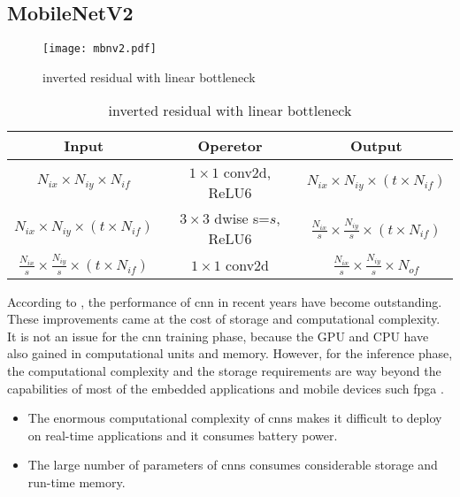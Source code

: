 \subsection{MobileNetV2} \label{subs:mbv2}
%
\begin{figure}
    \centering
    \texttt{[image: mbnv2.pdf]}
    \caption{inverted residual with linear bottleneck \cite{sandler_mobilenetv2_2019}}
    \label{fig:invreslinbot}
\end{figure}
\begin{table}
    \center
    \begin{tabular}{c|c|c}
        Input & Operetor & Output \\
        \hline \hline
        $N_{ix} \times N_{iy} \times N_{if}$ & $1 \times 1$ conv2d, ReLU6 & $N_{ix} \times N_{iy} \times (t \times N_{if})$ \\
        $N_{ix} \times N_{iy} \times (t \times N_{if})$ & $3 \times3$ dwise s=$s$, ReLU6 & $\frac{N_{ix}}{s} \times \frac{N_{iy}}{s} \times (t \times N_{if})$ \\
        $\frac{N_{ix}}{s} \times \frac{N_{iy}}{s} \times (t \times N_{if})$ & $1 \times 1$ conv2d & $\frac{N_{ix}}{s} \times \frac{N_{iy}}{s} \times N_{of}$ \\
        \hline \hline
    \end{tabular}
    \caption{inverted residual with linear bottleneck \cite{sandler_mobilenetv2_2019}}
    \label{tab:invreslinbot}
\end{table}
%
According to \textcite{cheng_recent_2018}, the performance of \acrshort{cnn} in recent years have become outstanding. These improvements came at the cost of storage and computational complexity. It is not an issue for the \acrshort{cnn} training phase, because the GPU and CPU have also gained in computational units and memory. However, for the inference phase, the computational complexity and the storage requirements are way beyond the capabilities of most of the embedded applications and mobile devices such \acrshort{fpga} \cite{cheng_recent_2018}.
%
\begin{itemize}
    \item The enormous computational complexity of \acrshort{cnn}s makes it difficult to deploy on real-time applications and it consumes battery power.
    \item The large number of parameters of \acrshort{cnn}s consumes considerable storage and run-time memory.
\end{itemize}

